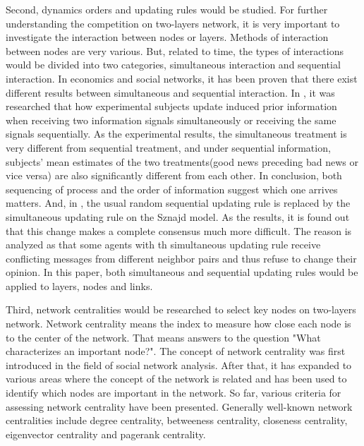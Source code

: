 Second, dynamics orders and updating rules would be studied. For further understanding the competition on two-layers network, it is very important to investigate the interaction between nodes or layers. Methods of interaction between nodes are very various.\parencite{sirbu2017} But, related to time, the types of interactions would be divided into two categories, simultaneous interaction and sequential interaction. In economics and social networks, it has been proven that there exist different results between simultaneous and sequential interaction.\parencite{hoffman2011, dietrich2004} In \parencite{hoffman2011}, it was researched that how experimental subjects update induced prior information when receiving two information signals simultaneously or receiving the same signals sequentially. As the experimental results, the simultaneous treatment is very different from sequential treatment, and under sequential information,  subjects’ mean estimates of the two treatments(good news preceding bad news or vice versa) are also significantly different from each other. In conclusion, both sequencing of process and the order of information suggest which one arrives matters. And, in \parencite{dietrich2004}, the usual random sequential updating rule is replaced by the simultaneous updating rule on the Sznajd model. As the results, it is found out that this change makes a complete consensus much more difficult. The reason is analyzed as that some agents with th simultaneous updating rule receive conflicting messages from different neighbor pairs and thus refuse to change their opinion. In this paper, both simultaneous and sequential updating rules would be applied to layers, nodes and links.

Third, network centralities would be researched to select key nodes on two-layers network. Network centrality means the index to measure how close each node is to the center of the network. That means answers to the question "What characterizes an important node?". The concept of network centrality was first introduced in the field of social network analysis.\parencite{freeman1979} After that, it has expanded to various areas where the concept of the network is related and has been used to identify which nodes are important in the network. So far, various criteria for assessing network centrality have been presented. Generally well-known network centralities include degree centrality, betweeness centrality, closeness centrality, eigenvector centrality and pagerank centrality.\parencite{koschutzki2008, francisco2019, bianconi2018}

